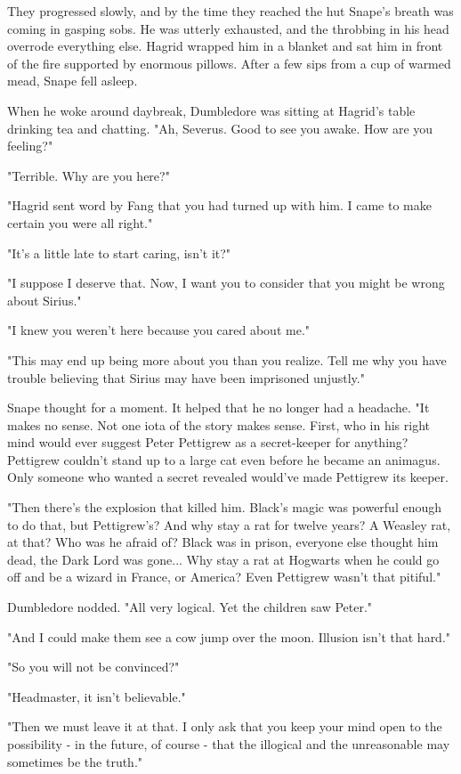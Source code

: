 They progressed slowly, and by the time they reached the hut Snape's breath was coming in gasping sobs. He was utterly exhausted, and the throbbing in his head overrode everything else. Hagrid wrapped him in a blanket and sat him in front of the fire supported by enormous pillows. After a few sips from a cup of warmed mead, Snape fell asleep.

When he woke around daybreak, Dumbledore was sitting at Hagrid's table drinking tea and chatting. "Ah, Severus. Good to see you awake. How are you feeling?"

"Terrible. Why are you here?"

"Hagrid sent word by Fang that you had turned up with him. I came to make certain you were all right."

"It's a little late to start caring, isn't it?"

"I suppose I deserve that. Now, I want you to consider that you might be wrong about Sirius."

"I knew you weren't here because you cared about me."

"This may end up being more about you than you realize. Tell me why you have trouble believing that Sirius may have been imprisoned unjustly."

Snape thought for a moment. It helped that he no longer had a headache. "It makes no sense. Not one iota of the story makes sense. First, who in his right mind would ever suggest Peter Pettigrew as a secret-keeper for anything? Pettigrew couldn't stand up to a large cat even before he became an animagus. Only someone who wanted a secret revealed would've made Pettigrew its keeper.

"Then there's the explosion that killed him. Black's magic was powerful enough to do that, but Pettigrew's? And why stay a rat for twelve years? A Weasley rat, at that? Who was he afraid of? Black was in prison, everyone else thought him dead, the Dark Lord was gone... Why stay a rat at Hogwarts when he could go off and be a wizard in France, or America? Even Pettigrew wasn't that pitiful."

Dumbledore nodded. "All very logical. Yet the children saw Peter."

"And I could make them see a cow jump over the moon. Illusion isn't that hard."

"So you will not be convinced?"

"Headmaster, it isn't believable."

"Then we must leave it at that. I only ask that you keep your mind open to the possibility - in the future, of course - that the illogical and the unreasonable may sometimes be the truth."

